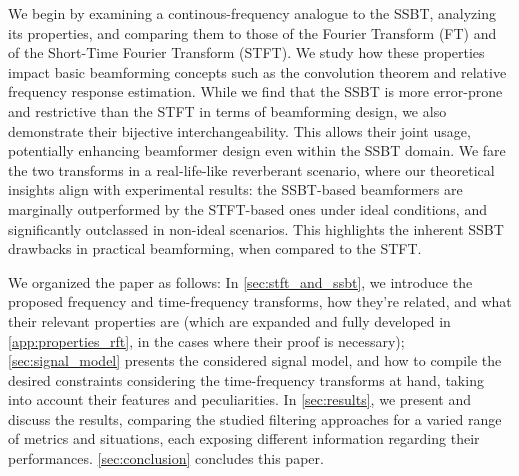 
We begin by examining a continous-frequency analogue to the SSBT, analyzing its properties, and comparing them to those of the Fourier Transform (FT) and of the Short-Time Fourier Transform (STFT). We study how these properties impact basic beamforming concepts such as the convolution theorem and relative frequency response estimation. While we find that the SSBT is more error-prone and restrictive than the STFT in terms of beamforming design, we also demonstrate their bijective interchangeability. This allows their joint usage, potentially enhancing beamformer design even within the SSBT domain. We fare the two transforms in a real-life-like reverberant scenario, where our theoretical insights align with experimental results: the SSBT-based beamformers are marginally outperformed by the STFT-based ones under ideal conditions, and significantly outclassed in non-ideal scenarios. This highlights the inherent SSBT drawbacks in practical beamforming, when compared to the STFT.


We organized the paper as follows:
In \cref{sec:stft_and_ssbt}, we introduce the proposed frequency and time-frequency transforms, how they're related, and what their relevant properties are (which are expanded and fully developed in \cref{app:properties_rft}, in the cases where their proof is necessary);
\cref{sec:signal_model} presents the considered signal model, and how to compile the desired constraints considering the time-frequency transforms at hand, taking into account their features and peculiarities.
In \cref{sec:results}, we present and discuss the results, comparing the studied filtering approaches for a varied range of metrics and situations, each exposing different information regarding their performances.
\cref{sec:conclusion} concludes this paper.